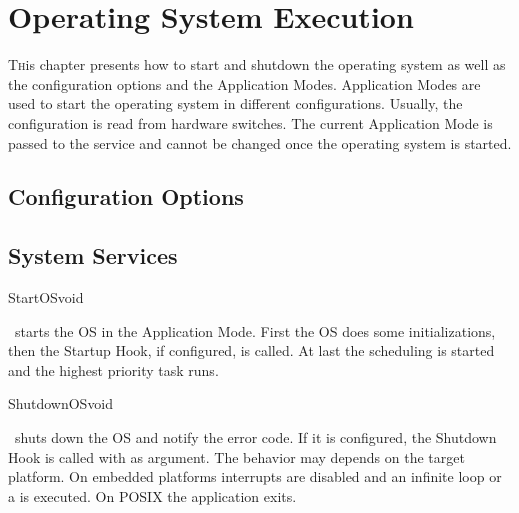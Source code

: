 
\chapter{Operating System Execution}
\label{chap:appmodes}

\lettrine{T}his chapter presents how to start and shutdown the operating system as well as the configuration options and the Application Modes. Application Modes are used to start the operating system in different configurations. Usually, the configuration is read from hardware switches. The current Application Mode is passed to the  service and cannot be changed once the operating system is started. 

\section{Configuration Options}

\section{System Services}

\begin{service}{StartOS}{void}

\apiname\ starts the OS in the  Application Mode. First the OS does some initializations, then the Startup Hook, if configured, is called. At last the scheduling is started and the highest priority task runs.



\end{service}

\begin{service}{ShutdownOS}{void}

\apiname\ shuts down the OS and notify the  error code. If it is configured, the Shutdown Hook is called with  as argument. The behavior may depends on the target platform. On embedded platforms interrupts are disabled and an infinite loop or a  is executed. On POSIX the application exits.

\end{service}

